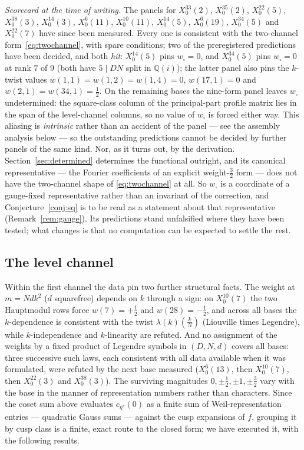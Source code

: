 \documentclass[11pt,reqno]{amsart}
\theoremstyle{plain}
\theoremstyle{definition}
\newcommand{\Q}{\mathbb{Q}}
\begin{document}
\emph{Scorecard at the time of writing.} The panels for $X_0^{33}(2)$, $X_0^{35}(2)$,
$X_0^{22}(5)$, $X_0^{38}(3)$, $X_0^{14}(3)$, $X_0^{6}(11)$, $X_0^{10}(11)$, $X_0^{14}(5)$,
$X_0^{6}(19)$, $X_0^{34}(5)$ and $X_0^{22}(7)$
have since been measured. Every one is consistent with the two-channel
form~\eqref{eq:twochannel}, with spare conditions; two of the preregistered predictions
have been decided, and both \emph{hit}: $X_0^{14}(5)$ pins $w_{\square}=0$, and
$X_0^{34}(5)$ pins $w_{\square}=0$ at rank $7$ of $9$ (both have $5\mid DN$ split in
$\Q(i)$); the latter panel also pins the $k$-twist values
$w(1,1)=w(1,2)=w(1,4)=0$, $w(17,1)=0$ and $w(2,1)=w(34,1)=\tfrac12$. On the remaining
bases the nine-form panel leaves $w_{\square}$ undetermined: the square-class column of the
principal-part profile matrix lies in the span of the level-channel columns, so no value of
$w_{\square}$ is forced either way. This aliasing is \emph{intrinsic} rather than an
accident of the panel --- see the assembly analysis below --- so the outstanding predictions
cannot be decided by further panels of the same kind. Nor, as it turns out, by the
derivation. Section~\ref{sec:determined} determines the functional outright, and its
canonical representative --- the Fourier coefficients of an explicit weight-$\tfrac32$ form
--- does not have the two-channel shape of \eqref{eq:twochannel} at all. So $w_{\square}$ is
a coordinate of a gauge-fixed representative rather than an invariant of the correction, and
Conjecture~\ref{conj:sq} is to be read as a statement about that representative
(Remark~\ref{rem:gauge}). Its predictions stand unfalsified where they have been tested; what
changes is that no computation can be expected to settle the rest.

\subsection*{The level channel}
Within the first channel the data pin two further structural facts. The weight at
$m=N d k^2$ ($d$ squarefree) depends on $k$ through a sign: on $X_0^{10}(7)$ the two Hauptmodul
rows force $w(7)=+\tfrac12$ and $w(28)=-\tfrac12$, and across all bases the $k$-dependence is
consistent with the twist $\lambda(k)\left(\tfrac kN\right)$ (Liouville times Legendre), while
$k$-independence and $k$-linearity are refuted. And no assignment of the weights by a fixed
product of Legendre symbols in $(D,N,d)$ covers all bases: three successive such laws, each
consistent with all data available when it was formulated, were refuted by the next base
measured ($X_0^{6}(13)$, then $X_0^{10}(7)$, then $X_0^{22}(3)$ and $X_0^{38}(3)$). The surviving
magnitudes $0,\pm\tfrac12,\pm1,\pm\tfrac32$ vary with the base in the manner of representation
numbers rather than characters. Since the coset sum above evaluates $c_{\eta^*}(0)$ as a finite
sum of Weil-representation entries --- quadratic Gauss sums --- against the cusp expansions of
$f$, grouping it by cusp class is a finite, exact route to the closed form; we have executed
it, with the following results.
\end{document}
